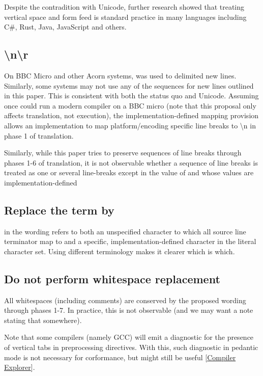 \documentclass{wg21}
\begin{document}
Despite the contradition with Unicode, further research showed that treating vertical space and form feed is standard practice in many languages
including C\#, Rust, Java, JavaScript and others.


\subsection{\textbackslash n\textbackslash r}

On BBC Micro and other Acorn systems,  was used to delimited new lines.
Similarly, some systems may not use any of the sequences for new lines outlined in this paper.
This is consistent with both the status quo and Unicode.
Assuming once could run a modern compiler on a BBC micro (note that this proposal only affects translation, not execution),
the implementation-defined mapping provision allows an implementation to map platform/encoding specific line breaks to \textbackslash n in phase 1
of translation.

Similarly, while this paper tries to preserve sequences of line breaks through phases 1-6 of translation, it is not observable
whether a sequence of line breaks is treated as one or several line-breaks except in the value of  and  whose values are implementation-defined

\subsection{Replace the term  by }

 in the wording refers to both an unspecified character to which all source line terminator map to and
a specific, implementation-defined character in the literal character set.
Using different terminology makes it clearer which is which.

\subsection{Do not perform whitespace replacement}

All whitespaces (including comments) are conserved by the proposed wording through phases 1-7.
In practice, this is not observable (and we may want a note stating that somewhere).

Note that some compilers (namely GCC) will emit a diagnostic for the presence of vertical tabs
in preprocessing directives.
With this, such diagnostic in pedantic mode is not necessary for corformance, but might still
be useful [\href{https://godbolt.org/z/r8hdzM6Gx}{Compiler Explorer}].
\end{document}
